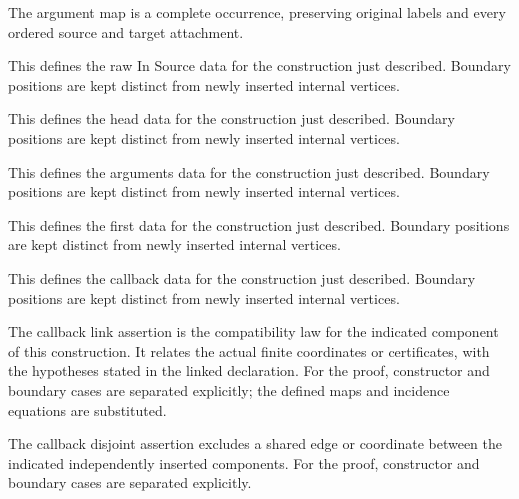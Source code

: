 The argument map is a complete occurrence, preserving original labels and every ordered source and target attachment.
\par{}

This defines the raw In Source data for the construction just described. Boundary positions are kept distinct from newly inserted internal vertices.
\par{}

This defines the head data for the construction just described. Boundary positions are kept distinct from newly inserted internal vertices.
\par{}

This defines the arguments data for the construction just described. Boundary positions are kept distinct from newly inserted internal vertices.
\par{}

This defines the first data for the construction just described. Boundary positions are kept distinct from newly inserted internal vertices.
\par{}

This defines the callback data for the construction just described. Boundary positions are kept distinct from newly inserted internal vertices.
\par{}

The callback link assertion is the compatibility law for the indicated component of this construction. It relates the actual finite coordinates or certificates, with the hypotheses stated in the linked declaration.
For the proof, constructor and boundary cases are separated explicitly; the defined maps and incidence equations are substituted.
\par{}

The callback disjoint assertion excludes a shared edge or coordinate between the indicated independently inserted components.
For the proof, constructor and boundary cases are separated explicitly.
\par{}

